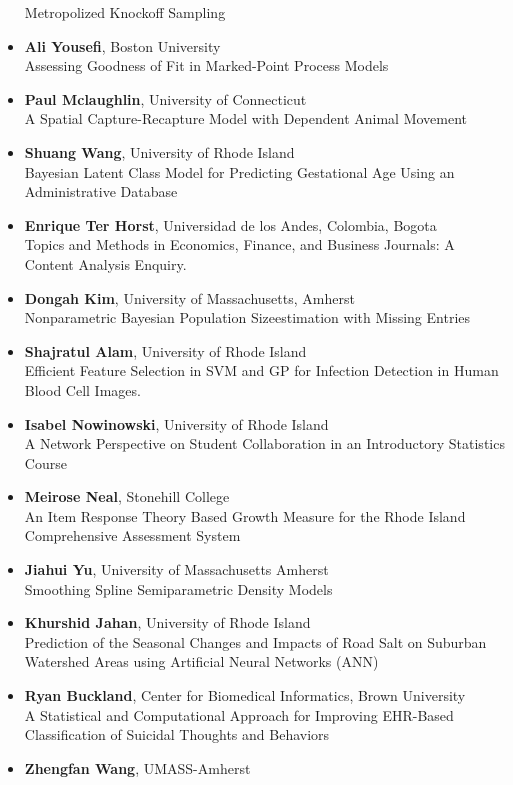 \begin{itemize}
Metropolized Knockoff Sampling
\item \textbf{Ali Yousefi}, Boston University \\
Assessing Goodness of Fit in Marked-Point Process Models
\item \textbf{Paul Mclaughlin}, University of Connecticut \\
A Spatial Capture-Recapture Model with Dependent Animal Movement
\item \textbf{Shuang Wang}, University of Rhode Island \\
Bayesian Latent Class Model for Predicting Gestational Age Using an Administrative Database
\item \textbf{Enrique Ter Horst}, Universidad de los Andes, Colombia, Bogota \\
Topics and Methods in Economics, Finance, and Business Journals: A Content Analysis Enquiry.
\item \textbf{Dongah Kim}, University of Massachusetts, Amherst \\
Nonparametric Bayesian Population Sizeestimation with Missing Entries
\item \textbf{Shajratul Alam}, University of Rhode Island \\
Efficient Feature Selection in SVM and GP for Infection Detection in Human Blood Cell Images.
\item \textbf{Isabel Nowinowski}, University of Rhode Island \\
A Network Perspective on Student Collaboration in an Introductory Statistics Course
\item \textbf{Meirose Neal}, Stonehill College \\
An Item Response Theory Based Growth Measure for the Rhode Island Comprehensive Assessment System
\item \textbf{Jiahui Yu}, University of Massachusetts Amherst \\
Smoothing Spline Semiparametric Density Models
\item \textbf{Khurshid Jahan}, University of Rhode Island \\
Prediction of the Seasonal Changes and Impacts of Road Salt on Suburban Watershed Areas using Artificial Neural Networks (ANN)
\item \textbf{Ryan Buckland}, Center for Biomedical Informatics, Brown University \\
A Statistical and Computational Approach for Improving EHR-Based Classification of Suicidal Thoughts and Behaviors
\item \textbf{Zhengfan Wang}, UMASS-Amherst \\

\end{itemize}
